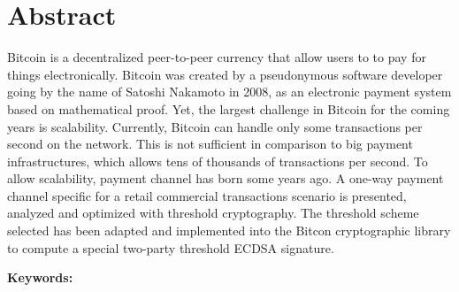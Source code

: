 \chapter*{Abstract}

Bitcoin is a decentralized peer-to-peer currency that allow users to to pay for
things electronically. Bitcoin was created by a pseudonymous software developer going by the name of
Satoshi Nakamoto in 2008, as an electronic payment system based on mathematical proof.
Yet, the largest challenge in Bitcoin for the coming years is scalability.
Currently, Bitcoin can handle only some transactions per second on the network.
This is not sufficient in comparison to big payment infrastructures, which allows tens of
thousands of transactions per second. To allow scalability, payment channel has born some years ago.
A one-way payment channel specific for a retail commercial transactions scenario is presented, analyzed and optimized with
threshold cryptography. The threshold scheme selected has been adapted and implemented
into the Bitcon cryptographic library to compute a special two-party threshold ECDSA signature.

\vskip0.5cm
\noindent\textbf{Keywords:}
\Keywords
